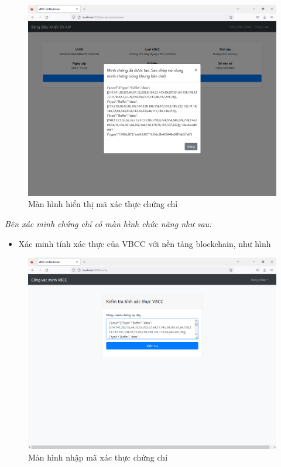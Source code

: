 \begin{figure}[htbp]
\centering
\includegraphics[width=.9\linewidth]{img/sv_minhchung.PNG}
\caption{Màn hình hiển thị mã xác thực chứng chỉ}
\label{fig:sv_minhchung}
\end{figure}



\emph{Bên xác minh chứng chỉ có màn hình chức năng như sau:}

\begin{itemize}
\item Xác minh tính xác thực của VBCC với nền tảng blockchain, như hình 
\end{itemize}

\begin{figure}[htbp]
\centering
\includegraphics[width=.9\linewidth]{img/v_begin.PNG}
\caption{Màn hình nhập mã xác thực chứng chỉ}
\label{fig:v_begin}
\end{figure}


